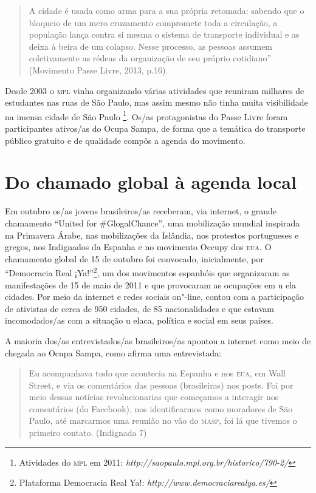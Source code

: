 \begin{quote}
A cidade é usada como arma para a sua própria retomada: sabendo que o
bloqueio de um mero cruzamento compromete toda a circulação, a população
lança contra si mesma o sistema de transporte individual e as deixa à
beira de um colapso. Nesse processo, as pessoas assumem coletivamente as
rédeas da organização de seu próprio cotidiano'' (Movimento Passe Livre,
2013, p.16).
\end{quote}

Desde 2003 o \textsc{mpl} vinha organizando várias atividades que reuniram
milhares de estudantes nas ruas de São Paulo, mas assim mesmo não tinha
muita visibilidade na imensa cidade de São Paulo \footnote{Atividades do
  \textsc{mpl} em 2011: \emph{http://saopaulo.mpl.org.br/historico/790-2/}}. Os/as
protagonistas do Passe Livre foram participantes ativos/as do Ocupa
Sampa, de forma que a temática do transporte público gratuito e de
qualidade compôs a agenda do movimento.

\section{Do chamado global à agenda local}

Em outubro os/as jovens brasileiros/as receberam, via internet, o grande
chamamento ``United for \#GlogalChance'', uma mobilização mundial
inspirada na Primavera Árabe, nas mobilizações da Islândia, nos
protestos portugueses e gregos, nos Indignados da Espanha e no movimento
Occupy dos \textsc{eua}. O chamamento global de 15 de outubro foi convocado,
inicialmente, por ``Democracia Real ¡Ya!''\footnote{Plataforma
  Democracia Real Ya!: \emph{http://www.democraciarealya.es/}}, um dos
movimentos espanhóis que organizaram as manifestações de 15 de maio de
2011 e que provocaram as ocupações em u ela cidades. Por meio da
internet e redes sociais on"-line, contou com a participação de ativistas
de cerca de 950 cidades, de 85 nacionalidades e que estavam
incomodados/as com a situação u elaca, política e social em seus países.

A maioria dos/as entrevistados/as brasileiros/as apontou a internet como
meio de chegada ao Ocupa Sampa, como afirma uma entrevistada:

\begin{quote}
Eu acompanhava tudo que acontecia na Espanha e nos \textsc{eua}, em Wall Street,
e via os comentários das pessoas (brasileiras) nos posts. Foi por meio
dessas notícias revolucionarias que começamos a interagir nos
comentários (do Facebook), nos identificarmos como moradores de São
Paulo, até marcarmos uma reunião no vão do \textsc{masp}, foi lá que tivemos o
primeiro contato. (Indignada 7)
\end{quote}

